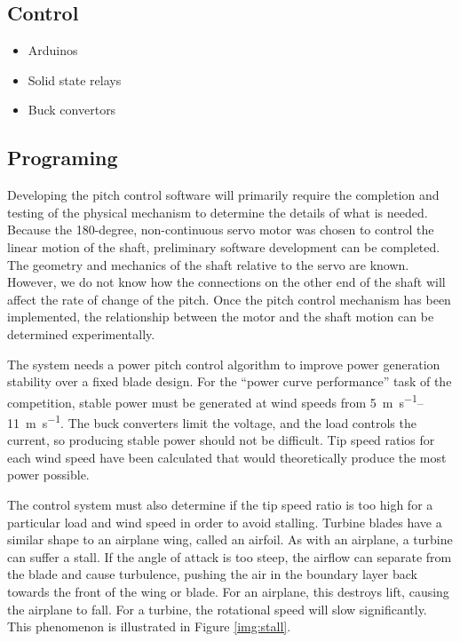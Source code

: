 \documentclass[11pt,letterpaper,conference]{IEEEtran}
\begin{document}
\subsection{Control}

\begin{itemize}
    \item Arduinos
    \item Solid state relays
    \item Buck convertors
\end{itemize}

\subsection{Programing}

Developing the pitch control software will primarily require the completion and
testing of the physical mechanism to determine the details of what is needed.
Because the 180-degree, non-continuous servo motor was chosen to control the
linear motion of the shaft, preliminary software development can be completed.
The geometry and mechanics of the shaft relative to the servo are known.
However, we do not know how the connections on the other end of the shaft will
affect the rate of change of the pitch. Once the pitch control mechanism has
been implemented, the relationship between the motor and the shaft motion can
be determined experimentally.

The system needs a power pitch control algorithm to improve power generation
stability over a fixed blade design. For the ``power curve performance'' task
of the competition, stable power must be generated at wind speeds from
\qtyrange{5}{11}{\m\per\s}. The buck converters limit the voltage, and the load
controls the current, so producing stable power should not be difficult. Tip
speed ratios for each wind speed have been calculated that would theoretically
produce the most power possible.

The control system must also determine if the tip speed ratio is too high for a
particular load and wind speed in order to avoid stalling. Turbine blades have
a similar shape to an airplane wing, called an airfoil. As with an airplane, a
turbine can suffer a stall. If the angle of attack is too steep, the airflow
can separate from the blade and cause turbulence, pushing the air in the
boundary layer back towards the front of the wing or blade. For an airplane,
this destroys lift, causing the airplane to fall. For a turbine, the rotational
speed will slow significantly. This phenomenon is illustrated in
Figure \ref{img:stall}.
\end{document}
